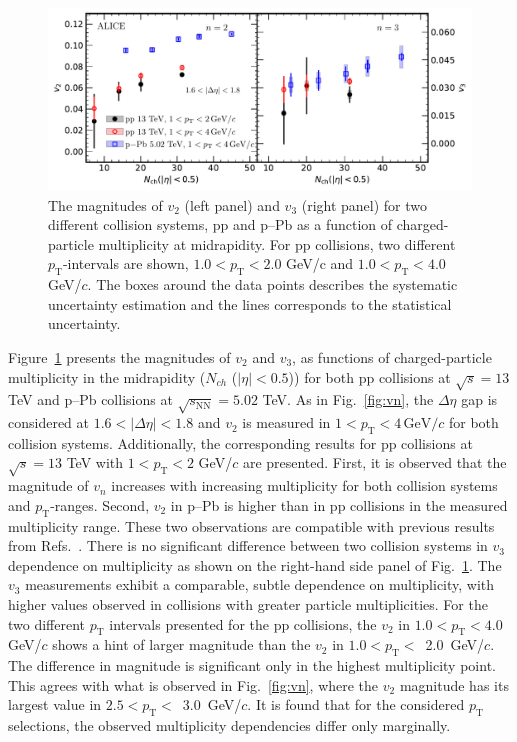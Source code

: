 \begin{figure}[!t]
	\centering
\includegraphics[width=1.0\textwidth]{figures/FIG5_v2Mult_allSystems_Data.pdf} 
	\caption{The magnitudes of $v_2$ (left
    panel) and $v_3$ (right panel) 
 for two different collision systems, pp and p--Pb as a function of charged-particle multiplicity at midrapidity. For pp collisions, two different $p_\mathrm{T}$-intervals are shown, $1.0<p_\mathrm{T}<2.0$ GeV/c and $1.0<p_\mathrm{T}<4.0$ GeV/$c$. The boxes around the data points describes the systematic uncertainty estimation and the lines corresponds to the statistical uncertainty.} 
	\label{fig:v2mult}
\end{figure}

Figure~\ref{fig:v2mult} presents the magnitudes of $v_2$ and $v_3$, as functions of charged-particle multiplicity in the midrapidity ($N_{ch}$ ($|\eta|<0.5$)) for both pp collisions at $\sqrt{s}=13$ TeV and p--Pb collisions at $\sqrt{s_\mathrm{NN}}=5.02$ TeV. As in Fig.~\ref{fig:vn}, the $\Delta\eta$ gap is considered at $1.6<|\Delta\eta|<1.8$ and $v_2$ is measured in $1<p_{\mathrm{T}}<4\,\mathrm{GeV}/c$ for both collision systems. Additionally, the corresponding results for pp collisions at $\sqrt{s}=13$ TeV with $1<p_{\mathrm{T}}<2$ GeV/$c$ are presented. First, it is observed that the magnitude of $v_n$ increases with increasing multiplicity for both collision systems and $p_\mathrm{T}$-ranges. Second, $v_2$ in p--Pb is higher than in pp collisions in the measured multiplicity range. These two observations are compatible with previous results from Refs.~\cite{ATLAS:2015hzw,ATLAS:2016yzd, Khachatryan:2015lva}. There is no significant difference between two collision systems in $v_3$ dependence on multiplicity as shown on the right-hand side panel of Fig.~\ref{fig:v2mult}. The $v_3$ measurements exhibit a comparable, subtle dependence on multiplicity, with higher values observed in collisions with greater particle multiplicities.
For the two different $p_\mathrm{T}$ intervals presented for the pp collisions, the $v_2$ in $1.0<p_\mathrm{T}<4.0$ GeV/$c$ shows a hint of larger magnitude than the $v_2$ in $1.0<p_\mathrm{T}<$~2.0~GeV/$c$. The difference in magnitude is significant only in the highest multiplicity point. 
This agrees with what is observed in Fig.~\ref{fig:vn}, where the $v_2$ magnitude has its largest value in $2.5<p_\mathrm{T}<$~3.0~GeV/$c$. It is found that for the considered $p_\mathrm{T}$ selections, the observed multiplicity dependencies differ only marginally.

